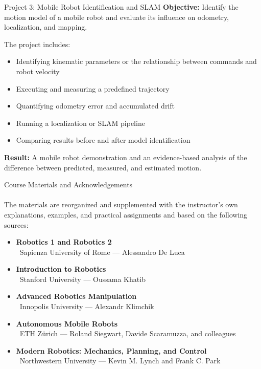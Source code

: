 \documentclass[aspectratio=169]{beamer}
\begin{document}
\begin{frame}[t]{Project 3: Mobile Robot Identification and SLAM}
    \small
    \vspace*{-0.3cm}
    \textbf{Objective:}
    Identify the motion model of a mobile robot and evaluate its
    influence on odometry, localization, and mapping.

    \medskip

    The project includes:
    \begin{itemize}
        \item Identifying kinematic parameters or the relationship
        between commands and robot velocity
        \item Executing and measuring a predefined trajectory
        \item Quantifying odometry error and accumulated drift
        \item Running a localization or SLAM pipeline
        \item Comparing results before and after model identification
    \end{itemize}

    \textbf{Result:}
    A mobile robot demonstration and an evidence-based analysis of the
    difference between predicted, measured, and estimated motion.
\end{frame}


\begin{frame}[t]{Course Materials and Acknowledgements}
    \framesubtitle{}
    \small
    \vspace*{-0.35cm}
    The materials are reorganized and supplemented with the instructor's
    own explanations, examples, and practical assignments and based on the following sources:

    \begin{itemize}
        \item \textbf{Robotics 1 and Robotics 2}
        \\\ Sapienza University of Rome --- Alessandro De Luca

        \item \textbf{Introduction to Robotics}
        \\\ Stanford University --- Oussama Khatib

        \item \textbf{Advanced Robotics Manipulation}
        \\\ Innopolis University --- Alexandr Klimchik

        \item \textbf{Autonomous Mobile Robots}
        \\\ ETH Zürich --- Roland Siegwart, Davide Scaramuzza, and colleagues

        \item \textbf{Modern Robotics: Mechanics, Planning, and Control}
        \\\ Northwestern University --- Kevin M. Lynch and Frank C. Park
    \end{itemize}
\end{frame}
\end{document}
